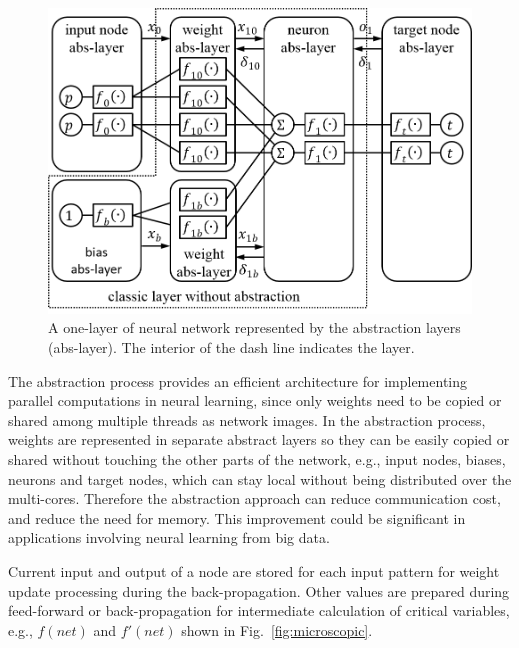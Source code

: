 \documentclass[procedia]{easychair}
\begin{document}
\begin{figure}[tb]
    \begin{centering}
        \includegraphics[scale=0.5]{../pic/nn_abstracted.png}
        \caption{A one-layer of neural network represented by the abstraction layers (abs-layer).  The interior of the dash line indicates the layer.}
        \label{fig:nn_abstracted}
	\end{centering}
\end{figure}

The abstraction process provides an efficient architecture for implementing parallel computations in neural learning, since only weights need to be copied or shared among multiple threads as network images.  In the abstraction process, weights are represented in separate abstract layers so they can be easily copied or shared without touching the other parts of the network, e.g., input nodes, biases, neurons and target nodes, which can stay local without being distributed over the multi-cores.  Therefore the abstraction approach can reduce communication cost, and reduce the need for memory.  This improvement could be significant in applications involving neural learning from big data.

Current input and output of a node are stored for each input pattern for weight update processing during the back-propagation.  Other values are prepared during feed-forward or back-propagation for intermediate calculation of critical variables, e.g., $f(net)$ and $f'(net)$ shown in Fig.~\ref{fig:microscopic}.
\end{document}
